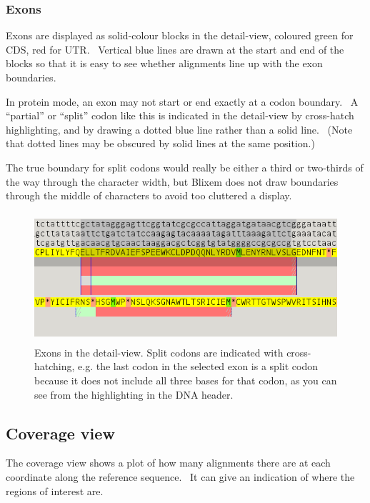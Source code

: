 \documentclass[letterpaper]{article}
\begin{document}
\bigskip

{\color[rgb]{0.30980393,0.5058824,0.7411765}\subsubsection[Exons]{Exons}}
{Exons are displayed as solid-colour blocks in the detail-view, coloured
green for CDS, red for UTR. \ Vertical blue lines are drawn at the
start and end of the blocks so that it is easy to see whether
alignments line up with the exon boundaries.}

\bigskip

{In protein mode, an exon may not start or end exactly at a codon
boundary. \ A {\textquotedblleft}partial{\textquotedblright} or
{\textquotedblleft}split{\textquotedblright} codon like this is
indicated in the detail-view by cross-hatch highlighting, and by
drawing a dotted blue line rather than a solid line. \ (Note that
dotted lines may be obscured by solid lines at the same position.)}

\bigskip

{The true boundary for split codons would really be either a third or
two-thirds of the way through the character width, but Blixem does not
draw boundaries through the middle of characters to avoid too cluttered
a display.}

\begin{figure}
\centering
\color[rgb]{0.30980393,0.5058824,0.7411765}
\includegraphics[width=12.321cm,height=4.801cm]{img_view_alignment_list_exons.png}
\caption{Exons in the detail-view.
Split codons are indicated with cross-hatching, e.g. the last codon in
the selected exon is a split codon because it does not include all
three bases for that codon, as you can see from the highlighting in the
DNA header.}
\end{figure}

\bigskip

{\color[rgb]{0.30980393,0.5058824,0.7411765}\subsection[Coverage view]{Coverage view}}
\hypertarget{RefHeading2953469222304}{}{
The coverage view shows a plot of how many alignments there are at each
coordinate along the reference sequence. \ It can give an indication of
where the regions of interest are.}
\end{document}
